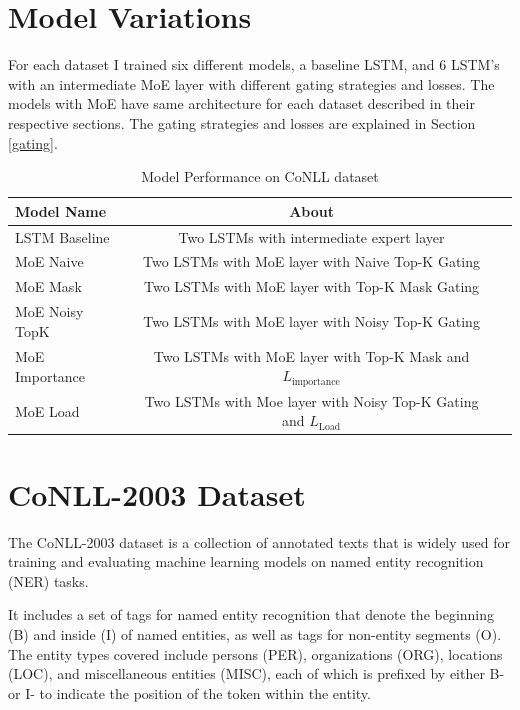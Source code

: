 \documentclass[12pt]{article}
\begin{document}
\section{Model Variations}
For each dataset I trained six different models, a baseline LSTM, and 6 LSTM's with an intermediate MoE layer with different gating strategies and losses. The models with MoE have same architecture for each dataset described in their respective sections. The gating strategies and losses are explained in Section \ref{gating}.
\begin{table}[h]
  \centering
  \begin{tabular}{lcc}
  \hline
  \textbf{Model Name} & \textbf{About}                        \\ \hline
  LSTM Baseline       &Two LSTMs with intermediate expert layer                       \\
  MoE Naive           &Two LSTMs with MoE layer with Naive Top-K Gating                       \\
  MoE Mask            &Two LSTMs with MoE layer with Top-K Mask Gating                         \\
  MoE Noisy TopK      &Two LSTMs with MoE layer with Noisy Top-K Gating                      \\
  MoE Importance      &Two LSTMs with MoE layer with Top-K Mask and $L_{\text{importance}}$                        \\
  MoE Load            &Two LSTMs with Moe layer with Noisy Top-K Gating and $L_{\text{Load}}$ \\ \hline
  \end{tabular}
  \caption{Model Performance on CoNLL dataset}
  \label{tab:models}
  \end{table}

\section{CoNLL-2003 Dataset}
The CoNLL-2003 dataset is a collection of annotated texts that is widely used for training and evaluating machine learning models on named entity recognition (NER) tasks.

It includes a set of tags for named entity recognition that denote the beginning (B) and inside (I) of named entities, as well as tags for non-entity segments (O). The entity types covered include persons (PER), organizations (ORG), locations (LOC), and miscellaneous entities (MISC), each of which is prefixed by either B- or I- to indicate the position of the token within the entity.
\end{document}
